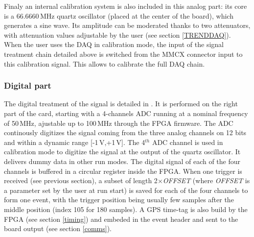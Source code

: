 %
Finaly an internal calibration system is also included in this analog part: its core is a 66.6660\,MHz quartz oscillator (placed at the center of the board), which generates a sine wave. Its amplitude can be moderated thanks to two attenuators, with attenuation values adjustable by the user (see section \ref{TRENDDAQ}). When the user uses the DAQ in calibration mode, the input of the signal treatment chain detailed above is switched from the MMCX connector input to this calibration signal. This allows to calibrate the full DAQ chain. 
   

\subsubsection{Digital part}
\label{digital}
The digital treatment of the signal is detailed in \cite{GP35daq}. It is performed on the right part of the card, starting with a 4-channels ADC \cite{ADCdoc} running at a nominal frequency of 50\,MHz, ajustable up to 100\,MHz through the FPGA firmware. The ADC continously digitizes the signal coming from the three analog channels on 12 bits and within a dynamic range [-1\,V,+1\,V]. The 4$^{th}$ ADC channel is used in calibration mode to digitize the signal at the output of the quartz oscillator. It delivers dummy data in other run modes. The digital signal of each of the four channels is buffered in a circular register inside the FPGA. When one trigger is received (see previous section), a subset of length 2$\times${\it OFFSET} (where {\it OFFSET} is a parameter set by the user at run start) is saved for each of the four channels to form one event, with the trigger position being usually few samples after the middle position (index 105 for 180 samples). A GPS time-tag is also build  by the FPGA (see section \ref{timing}) and embeded in the event header and sent to the board output (see section \ref{comms}).


